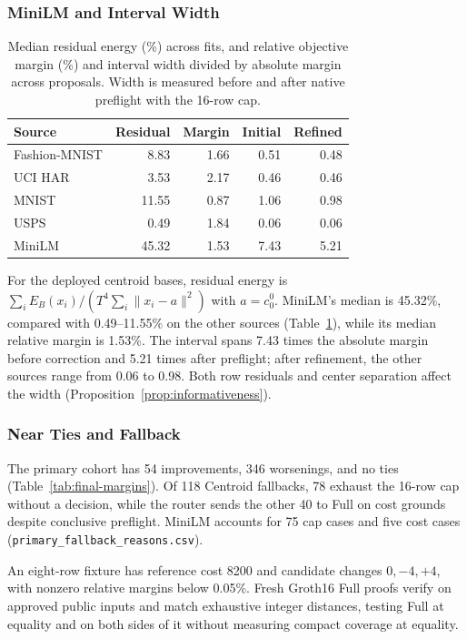 \documentclass[5p,times,twocolumn]{elsarticle}
\begin{document}
\subsubsection{MiniLM and Interval Width}
\begin{table}[tbp]
\centering\small
\caption{Median residual energy (\%) across fits, and relative
objective margin (\%) and interval width divided by absolute margin
across proposals. Width is measured before and after native preflight
with the 16-row cap.}
\label{tab:minilm-width}
\begin{tabular}{@{}lrrrr@{}}\toprule
Source & Residual & Margin & Initial & Refined\\\midrule
Fashion-MNIST & 8.83 & 1.66 & 0.51 & 0.48\\
UCI HAR & 3.53 & 2.17 & 0.46 & 0.46\\
MNIST & 11.55 & 0.87 & 1.06 & 0.98\\
USPS & 0.49 & 1.84 & 0.06 & 0.06\\
MiniLM & 45.32 & 1.53 & 7.43 & 5.21\\
\bottomrule\end{tabular}
\end{table}

For the deployed centroid bases, residual energy is $\sum_i E_B(x_i)/(T^4\sum_i\|x_i-a\|^2)$ with $a=c_0^0$. MiniLM's median is 45.32\%, compared with 0.49--11.55\% on the other sources (Table~\ref{tab:minilm-width}), while its median relative margin is 1.53\%. The interval spans 7.43 times the absolute margin before correction and 5.21 times after preflight; after refinement, the other sources range from 0.06 to 0.98. Both row residuals and center separation affect the width (Proposition~\ref{prop:informativeness}).

\subsubsection{Near Ties and Fallback}
The primary cohort has 54 improvements, 346 worsenings, and no ties (Table~\ref{tab:final-margins}). Of 118 Centroid fallbacks, 78 exhaust the 16-row cap without a decision, while the router sends the other 40 to Full on cost grounds despite conclusive preflight. MiniLM accounts for 75 cap cases and five cost cases (\texttt{primary\_fallback\_reasons.csv}).

An eight-row fixture has reference cost 8200 and candidate changes $0,-4,+4$, with nonzero relative margins below 0.05\%. Fresh Groth16 Full proofs verify on approved public inputs and match exhaustive integer distances, testing Full at equality and on both sides of it without measuring compact coverage at equality.
\end{document}
